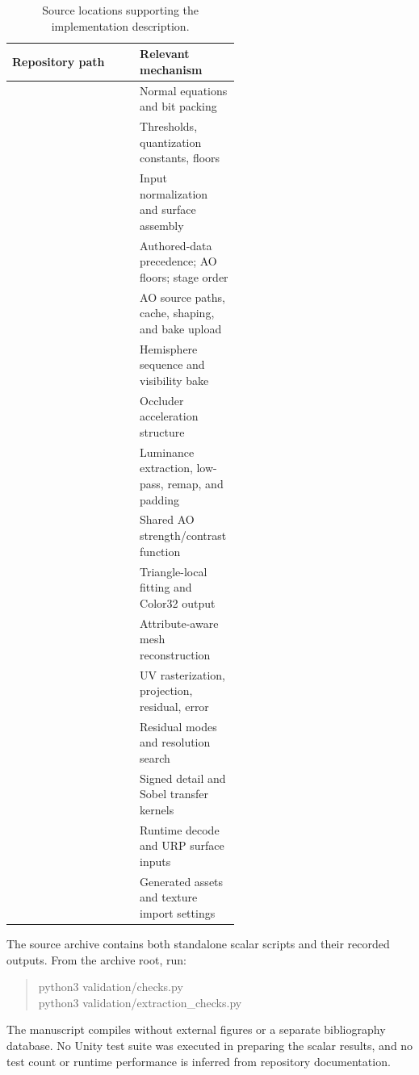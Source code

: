 \documentclass[11pt,letterpaper]{article}
\begin{document}
\begin{table}[htbp]
\centering
\caption{Source locations supporting the implementation description.}
\label{tab:trace}
\small
\begin{tabularx}{\linewidth}{@{}p{0.56\linewidth}Y@{}}
\toprule
Repository path & Relevant mechanism \\
\midrule
{} & Normal equations and bit packing \\
 & Thresholds, quantization constants, floors \\
 & Input normalization and surface assembly \\
 & Authored-data precedence; AO floors; stage order \\
 & AO source paths, cache, shaping, and bake upload \\
 & Hemisphere sequence and visibility bake \\
 & Occluder acceleration structure \\
 & Luminance extraction, low-pass, remap, and padding \\
 & Shared AO strength/contrast function \\
 & Triangle-local fitting and Color32 output \\
 & Attribute-aware mesh reconstruction \\
 & UV rasterization, projection, residual, error \\
 & Residual modes and resolution search \\
 & Signed detail and Sobel transfer kernels \\
 & Runtime decode and URP surface inputs \\
 & Generated assets and texture import settings \\
\bottomrule
\end{tabularx}
\end{table}

The source archive contains both standalone scalar scripts and their recorded outputs. From the archive root, run:
\begin{quote}
\small\ttfamily
python3 validation/checks.py\\
python3 validation/extraction\_checks.py
\end{quote}
The manuscript compiles without external figures or a separate bibliography database. No Unity test suite was executed in preparing the scalar results, and no test count or runtime performance is inferred from repository documentation.
\end{document}
